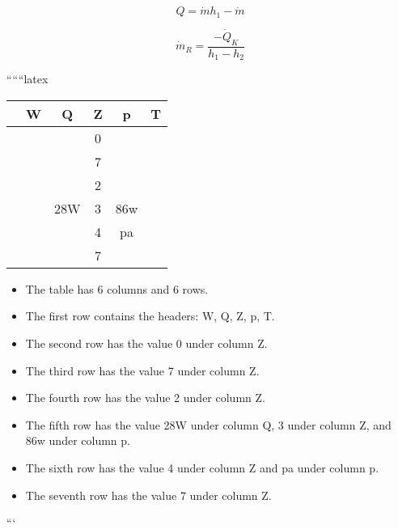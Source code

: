 \[
Q = \dot{m} h_{1} - \dot{m}
\]

\[
\dot{m}_R = \frac{-\dot{Q}_K}{h_1 - h_2}
\]

``````latex


\begin{tabular}{|c|c|c|c|c|c|}
\hline
 & W & Q & Z & p & T \\
\hline
 & & & 0 & & \\
\hline
 & & & 7 & & \\
\hline
 & & & 2 & & \\
\hline
 & & 28W & 3 & 86w & \\
\hline
 & & & 4 & pa & \\
\hline
 & & & 7 & & \\
\hline
\end{tabular}

\vspace{1cm}

\begin{itemize}
    \item The table has 6 columns and 6 rows.
    \item The first row contains the headers: W, Q, Z, p, T.
    \item The second row has the value 0 under column Z.
    \item The third row has the value 7 under column Z.
    \item The fourth row has the value 2 under column Z.
    \item The fifth row has the value 28W under column Q, 3 under column Z, and 86w under column p.
    \item The sixth row has the value 4 under column Z and pa under column p.
    \item The seventh row has the value 7 under column Z.
\end{itemize}

```